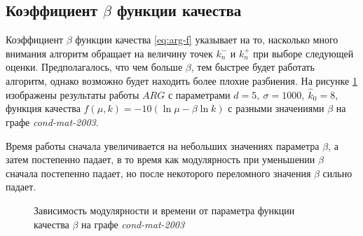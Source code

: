 
\subsection{Коэффициент $\beta$ функции качества}

Коэффициент $\beta$ функции качества \eqref{eq:arg-f} указывает на то, насколько много внимания алгоритм обращает на величину точек $k^{-}_n$ и $k^{+}_n$ при выборе следующей оценки. Предполагалось, что чем больше $\beta$, тем быстрее будет работать алгоритм, однако возможно будет находить более плохие разбиения. На рисунке \ref{fig:arg-beta} изображены результаты работы $ARG$ с параметрами $d = 5,\ \sigma = 1000,\ \hat{k}_0 = 8$, функция качества $f(\mu, k) = -10(\ln \mu - \beta \ln k)$ с разными значениями $\beta$ на графе \emph{cond-mat-2003}.

Время работы сначала увеличивается на небольших значениях параметра $\beta$, а затем постепенно падает, в то время как модулярность при уменьшении $\beta$ сначала постепенно падает, но после некоторого переломного значения $\beta$ сильно падает.

\begin{figure}[H]
	\caption{Зависимость модулярности и времени от параметра функции качества $\beta$ на графе \emph{cond-mat-2003}}
	\label{fig:arg-beta}
\end{figure}


